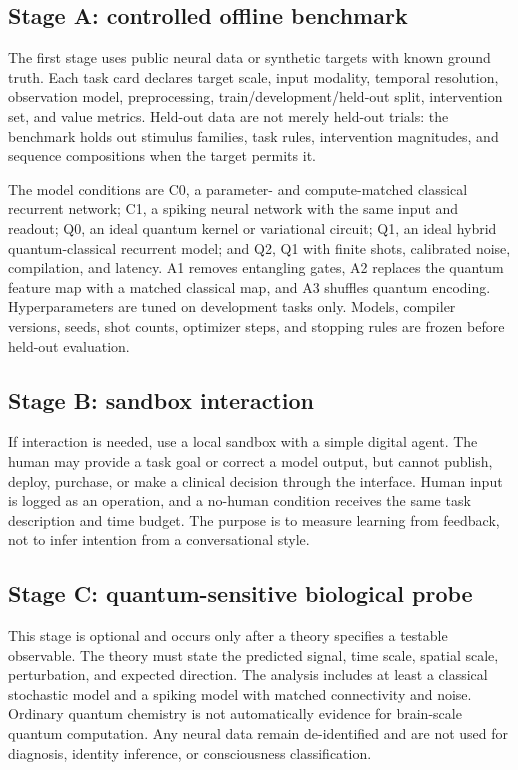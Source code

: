 \documentclass[conference]{IEEEtran}
\begin{document}
\subsection{Stage A: controlled offline benchmark}

The first stage uses public neural data or synthetic targets with known ground truth.
Each task card declares target scale, input modality, temporal resolution, observation
model, preprocessing, train/development/held-out split, intervention set, and value
metrics. Held-out data are not merely held-out trials: the benchmark holds out stimulus
families, task rules, intervention magnitudes, and sequence compositions when the target
permits it.

The model conditions are C0, a parameter- and compute-matched classical recurrent
network; C1, a spiking neural network with the same input and readout; Q0, an ideal
quantum kernel or variational circuit; Q1, an ideal hybrid quantum-classical recurrent
model; and Q2, Q1 with finite shots, calibrated noise, compilation, and latency. A1
removes entangling gates, A2 replaces the quantum feature map with a matched classical
map, and A3 shuffles quantum encoding. Hyperparameters are tuned on development tasks
only. Models, compiler versions, seeds, shot counts, optimizer steps, and stopping rules
are frozen before held-out evaluation.

\subsection{Stage B: sandbox interaction}

If interaction is needed, use a local sandbox with a simple digital agent. The human may
provide a task goal or correct a model output, but cannot publish, deploy, purchase, or
make a clinical decision through the interface. Human input is logged as an operation,
and a no-human condition receives the same task description and time budget. The purpose
is to measure learning from feedback, not to infer intention from a conversational style.

\subsection{Stage C: quantum-sensitive biological probe}

This stage is optional and occurs only after a theory specifies a testable observable.
The theory must state the predicted signal, time scale, spatial scale, perturbation, and
expected direction. The analysis includes at least a classical stochastic model and a
spiking model with matched connectivity and noise. Ordinary quantum chemistry is not
automatically evidence for brain-scale quantum computation. Any neural data remain
de-identified and are not used for diagnosis, identity inference, or consciousness
classification.
\end{document}
